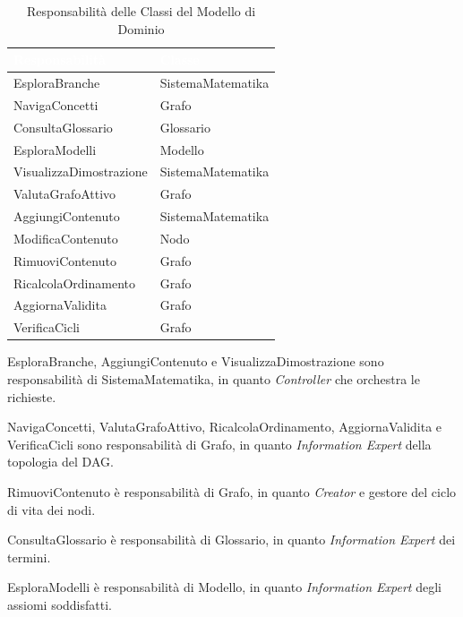 \documentclass[12pt,a4paper]{article}
\begin{document}
\begin{table}[H]
    \centering
    \small
    \begin{tabularx}{\textwidth}{|X|l|}
        \hline
        \rowcolor{PrimaryBlue} \textcolor{white}{\textbf{Responsabilità}} & \textcolor{white}{\textbf{Classe}} \\
        \hline
        EsploraBranche & SistemaMatematika \\
        \hline
        \rowcolor{CodeBg} NavigaConcetti & Grafo \\
        \hline
        ConsultaGlossario & Glossario \\
        \hline
        \rowcolor{CodeBg} EsploraModelli & Modello \\
        \hline
        VisualizzaDimostrazione & SistemaMatematika \\
        \hline
        \rowcolor{CodeBg} ValutaGrafoAttivo & Grafo \\
        \hline
        AggiungiContenuto & SistemaMatematika \\
        \hline
        \rowcolor{CodeBg} ModificaContenuto & Nodo \\
        \hline
        RimuoviContenuto & Grafo \\
        \hline
        \rowcolor{CodeBg} RicalcolaOrdinamento & Grafo \\
        \hline
        AggiornaValidita & Grafo \\
        \hline
        \rowcolor{CodeBg} VerificaCicli & Grafo \\
        \hline
    \end{tabularx}
    \caption{Responsabilità delle Classi del Modello di Dominio}
\end{table}

EsploraBranche, AggiungiContenuto e VisualizzaDimostrazione sono responsabilità di SistemaMatematika, in quanto \textit{Controller} che orchestra le richieste.

NavigaConcetti, ValutaGrafoAttivo, RicalcolaOrdinamento, AggiornaValidita e VerificaCicli sono responsabilità di Grafo, in quanto \textit{Information Expert} della topologia del DAG.

RimuoviContenuto è responsabilità di Grafo, in quanto \textit{Creator} e gestore del ciclo di vita dei nodi.

ConsultaGlossario è responsabilità di Glossario, in quanto \textit{Information Expert} dei termini.

EsploraModelli è responsabilità di Modello, in quanto \textit{Information Expert} degli assiomi soddisfatti.
\end{document}
